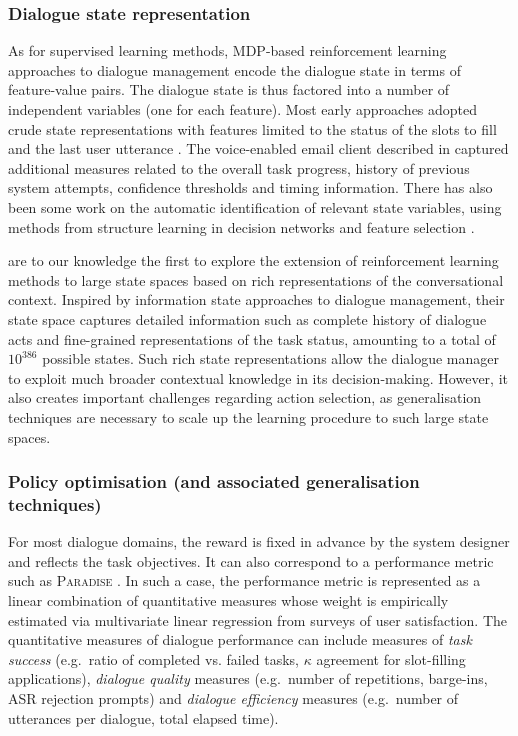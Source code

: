 \subsubsection*{Dialogue state representation}

As for supervised learning methods, MDP-based reinforcement learning approaches to dialogue management encode the dialogue state in terms of feature-value pairs.  The dialogue state is thus factored into a number of independent variables (one for each feature).  Most early approaches adopted crude state representations with features limited to the status of the slots to fill and the last user utterance \citep{817450,Singh:2000:EER:647288.723412,Scheffler:2002}.  The voice-enabled email client described in \cite{Walker:2000} captured additional measures related to the overall task progress, history of previous system attempts, confidence thresholds and timing information.  There has also been some work on the automatic identification of relevant state variables, using methods from structure learning in decision networks \citep{PaekC06} and feature selection \citep{tetreault2006using}. 

\cite{Henderson:2008} are to our knowledge the first to explore the extension of reinforcement learning methods to large state spaces based on rich representations of the conversational context. Inspired by information state approaches to dialogue management, their state space captures detailed information such as complete history of dialogue acts and fine-grained representations of the task status, amounting to a total of $10^{386}$ possible states.  Such rich state representations allow the dialogue manager to exploit much broader contextual knowledge in its decision-making.  However, it also creates important challenges regarding action selection, as generalisation techniques are necessary to scale up the learning procedure to such large state spaces.

\subsubsection{Policy optimisation (and associated generalisation techniques)}

For most dialogue domains, the reward is fixed in advance by the system designer and reflects the task objectives.  It can also correspond to a performance metric such as \textsc{Paradise} \citep{Walker:2000}.  In such a case, the performance metric is represented as a linear combination of quantitative measures whose weight is empirically estimated via multivariate linear regression from surveys of user satisfaction.  The quantitative measures of dialogue performance can include measures of \textit{task success} (e.g.\ ratio of completed vs. failed tasks, $\kappa$ agreement for slot-filling applications), \textit{dialogue quality} measures (e.g.\ number of repetitions, barge-ins, ASR rejection prompts) and \textit{dialogue efficiency} measures (e.g.\ number of utterances per dialogue, total elapsed time).

